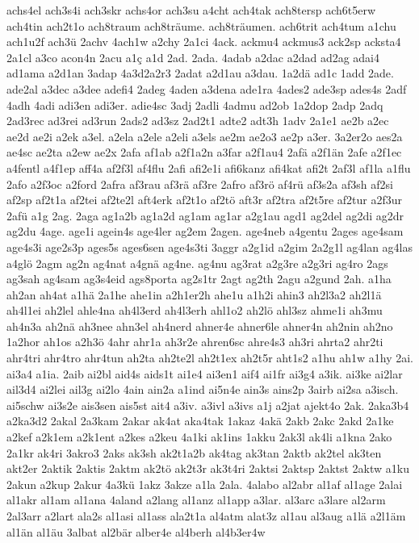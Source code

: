 {achs4el
ach3s4i
ach3skr
achs4or
ach3su
a4cht
ach4tak
ach8tersp
ach6t5erw
ach4tin
ach2t1o
ach8traum
ach8träume.
ach8träumen.
ach6trit
ach4tum
a1chu
ach1u2f
ach3ü
2achv
4ach1w
a2chy
2a1ci
4ack.
ackmu4
ackmus3
ack2sp
acksta4
2a1cl
a3co
acon4n
2acu
a1ç
a1d
2ad.
2ada.
4adab
a2dac
a2dad
ad2ag
adai4
ad1ama
a2d1an
3adap
4a3d2a2r3
2adat
a2d1au
a3dau.
1a2dä
ad1c
1add
2ade.
ade2al
a3dec
a3dee
adefi4
2adeg
4aden
a3dena
ade1ra
4ades2
ade3sp
ades4s
2adf
4adh
4adi
adi3en
adi3er.
adie4sc
3adj
2adli
4admu
ad2ob
1a2dop
2adp
2adq
2ad3rec
ad3rei
ad3run
2ads2
ad3sz
2ad2t1
adte2
adt3h
1adv
2a1e1
ae2b
a2ec
ae2d
ae2i
a2ek
a3el.
a2ela
a2ele
a2eli
a3els
ae2m
ae2o3
ae2p
a3er.
3a2er2o
aes2a
ae4sc
ae2ta
a2ew
ae2x
2afa
af1ab
a2f1a2n
a3far
a2f1au4
2afä
a2f1än
2afe
a2f1ec
a4fentl
a4f1ep
aff4a
af2f3l
af4flu
2afi
afi2e1i
afi6kanz
afi4kat
afi2t
2af3l
af1la
a1flu
2afo
a2f3oc
a2ford
2afra
af3rau
af3rä
af3re
2afro
af3rö
af4rü
af3s2a
af3sh
af2si
af2sp
af2t1a
af2tei
af2te2l
aft4erk
af2t1o
af2tö
aft3r
af2tra
af2t5re
af2tur
a2f3ur
2afü
a1g
2ag.
2aga
ag1a2b
ag1a2d
ag1am
ag1ar
a2g1au
agd1
ag2del
ag2di
ag2dr
ag2du
4age.
age1i
agein4s
age4ler
ag2em
2agen.
age4neb
a4gentu
2ages
age4sam
age4s3i
age2s3p
ages5s
ages6sen
age4s3ti
3aggr
a2g1id
a2gim
2a2g1l
ag4lan
ag4las
a4glö
2agm
ag2n
ag4nat
a4gnä
ag4ne.
ag4nu
ag3rat
a2g3re
a2g3ri
ag4ro
2ags
ag3sah
ag4sam
ag3s4eid
ags8porta
ag2s1tr
2agt
ag2th
2agu
a2gund
2ah.
a1ha
ah2an
ah4at
a1hä
2a1he
ahe1in
a2h1er2h
ahe1u
a1h2i
ahin3
ah2l3a2
ah2l1ä
ah4l1ei
ah2lel
ahle4na
ah4l3erd
ah4l3erh
ahl1o2
ah2lö
ahl3sz
ahme1i
ah3mu
ah4n3a
ah2nä
ah3nee
ahn3el
ah4nerd
ahner4e
ahner6le
ahner4n
ah2nin
ah2no
1a2hor
ah1os
a2h3ö
4ahr
ahr1a
ah3r2e
ahren6sc
ahre4s3
ah3ri
ahrta2
ahr2ti
ahr4tri
ahr4tro
ahr4tun
ah2ta
ah2te2l
ah2t1ex
ah2t5r
aht1s2
a1hu
ah1w
a1hy
2ai.
ai3a4
a1ia.
2aib
ai2bl
aid4s
aids1t
ai1e4
ai3en1
aif4
ai1fr
ai3g4
a3ik.
ai3ke
ai2lar
ail3d4
ai2lei
ail3g
ai2lo
4ain
ain2a
a1ind
ai5n4e
ain3s
ains2p
3airb
ai2sa
a3isch.
ai5schw
ai3s2e
ais3sen
ais5st
ait4
a3iv.
a3ivl
a3ivs
a1j
a2jat
ajekt4o
2ak.
2aka3b4
a2ka3d2
2akal
2a3kam
2akar
ak4at
aka4tak
1akaz
4akä
2akb
2akc
2akd
2a1ke
a2kef
a2k1em
a2k1ent
a2kes
a2keu
4a1ki
ak1ins
1akku
2ak3l
ak4li
a1kna
2ako
2a1kr
ak4ri
3akro3
2aks
ak3sh
ak2t1a2b
ak4tag
ak3tan
2aktb
ak2tel
ak3ten
akt2er
2aktik
2aktis
2aktm
ak2tö
ak2t3r
ak3t4ri
2aktsi
2aktsp
2aktst
2aktw
a1ku
2akun
a2kup
2akur
4a3kü
1akz
3akze
a1la
2ala.
4alabo
al2abr
al1af
al1age
2alai
al1akr
al1am
al1ana
4aland
a2lang
al1anz
al1app
a3lar.
al3arc
a3lare
al2arm
2al3arr
a2lart
ala2s
al1asi
al1ass
ala2t1a
al4atm
alat3z
al1au
al3aug
a1lä
a2l1äm
al1än
al1äu
3albat
al2bär
alber4e
al4berh
al4b3er4w
}
